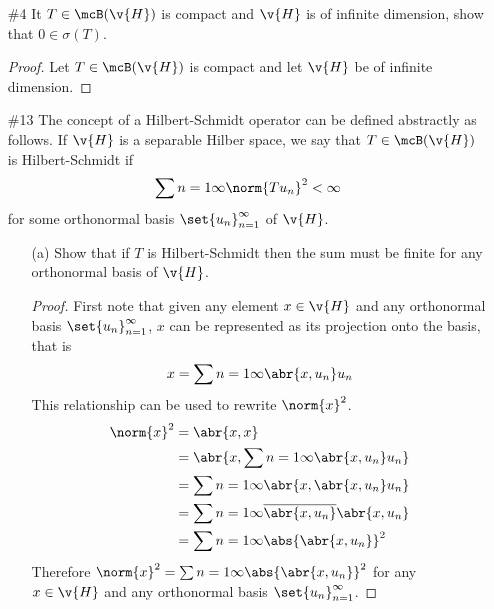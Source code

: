\documentclass[11pt, oneside]{article}
\begin{document}
\begin{enumerate}
\begin{proof}
      Now let $T$ be a compact operator, then by problem 1 $TT^*$ is compact as
      $T^* \in \mcB(\v{H})$.
      Now since $T^{**} = T$, this implies $\p{T^*}^* T^*$ is compact as well.
      Therefore by first part of this problem $T^*$ is compact.
    \end{proof}

  \pagebreak
  \item[\#4]
    It $T \in \mcB(\v{H})$ is compact and $\v{H}$ is of infinite dimension,
    show that $0 \in \sigma(T)$.

    \begin{proof}
      Let $T \in \mcB(\v{H})$ is compact and let $\v{H}$ be of infinite
      dimension.
      
      

    \end{proof}

  \pagebreak
  \item[\#13]
    The concept of a Hilbert-Schmidt operator can be defined abstractly as
    follows.
    If $\v{H}$ is a separable Hilber space, we say that $T \in \mcB(\v{H})$ is
    Hilbert-Schmidt if
    \[
      \sum{n = 1}{\infty}{\norm{Tu_n}^2} < \infty
    \]
    for some orthonormal basis $\set{u_n}_{n = 1}^{\infty}$ of $\v{H}$.
    \begin{enumerate}
      \item[(a)] %
        Show that if $T$ is Hilbert-Schmidt then the sum must be finite for any
        orthonormal basis of $\v{H}$.

        \begin{proof}
          First note that given any element $x \in \v{H}$ and any orthonormal
          basis $\set{u_n}_{n = 1}^{\infty}$, $x$ can be represented as its
          projection onto the basis, that is
          \[
            x = \sum{n = 1}{\infty}{\abr{x, u_n} u_n}
          \]
          This relationship can be used to rewrite $\norm{x}^2$.
          \begin{align*}
            \norm{x}^2 &= \abr{x, x} \\
            &= \abr{x, \sum{n = 1}{\infty}{\abr{x, u_n} u_n}} \\
            &= \sum{n = 1}{\infty}{\abr{x, \abr{x, u_n} u_n}} \\
            &= \sum{n = 1}{\infty}{\overline{\abr{x, u_n}} \abr{x, u_n}} \\
            &= \sum{n = 1}{\infty}{\abs{\abr{x, u_n}}^2} \\
          \end{align*}
          Therefore $\norm{x}^2 = \sum{n = 1}{\infty}{\abs{\abr{x, u_n}}^2}$
          for any $x \in \v{H}$ and any orthonormal basis
          $\set{u_n}_{n = 1}^{\infty}$.


\end{proof}
\end{enumerate}
\end{enumerate}
\end{document}
